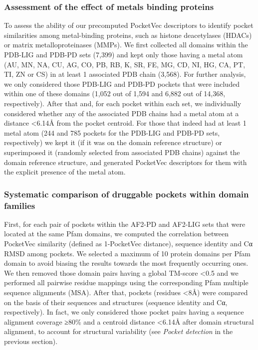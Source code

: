 \subsubsection{Assessment of the effect of metals binding proteins}

To assess the ability of our precomputed PocketVec descriptors to identify pocket similarities among metal-binding proteins, such as histone deacetylases (HDACs) or matrix metalloproteinases (MMPs). We first collected all domains within the PDB-LIG and PDB-PD sets (7,399) and kept only those having a metal atom (AU, MN, NA, CU, AG, CO, PB, RB, K, SR, FE, MG, CD, NI, HG, CA, PT, TI, ZN or CS) in at least 1 associated PDB chain (3,568). For further analysis, we only considered those PDB-LIG and PDB-PD pockets that were included within one of these domains (1,052 out of 1,594 and 6,882 out of 14,368, respectively). After that and, for each pocket within each set, we individually considered whether any of the associated PDB chains had a metal atom at a distance <6.14Å from the pocket centroid. For those that indeed had at least 1 metal atom (244 and 785 pockets for the PDB-LIG and PDB-PD sets, respectively) we kept it (if it was on the domain reference structure) or superimposed it (randomly selected from associated PDB chains) against the domain reference structure, and generated PocketVec descriptors for them with the explicit presence of the metal atom. 


\subsubsection{Systematic comparison of druggable pockets within domain families}

First, for each pair of pockets within the AF2-PD and AF2-LIG sets that were located at the same Pfam domains, we computed the correlation between PocketVec similarity (defined as 1-PocketVec distance), sequence identity and Cα RMSD among pockets. We selected a maximum of 10 protein domains per Pfam domain to avoid biasing the results towards the most frequently occurring ones. We then removed those domain pairs having a global TM-score <0.5 and we performed all pairwise residue mappings using the corresponding Pfam multiple sequence alignments (MSA). After that, pockets (residues <8Å) were compared on the basis of their sequences and structures (sequence identity and Cα, respectively). In fact, we only considered those pocket pairs having a sequence alignment coverage ≥80\% and a centroid distance <6.14Å after domain structural alignment, to account for structural variability (see \textit{Pocket detection} in the previous section).

